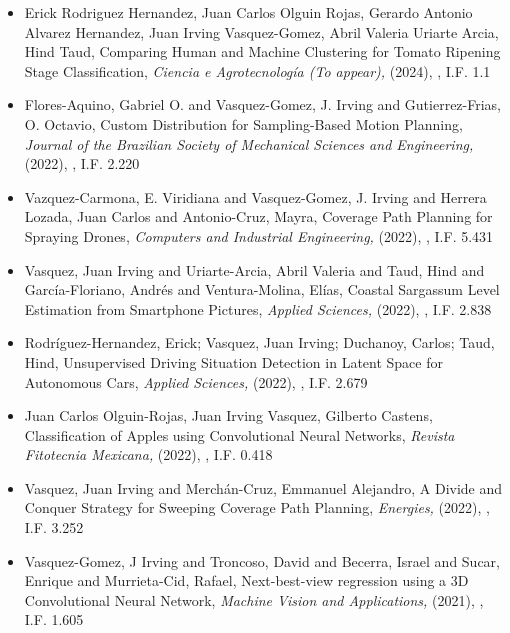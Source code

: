 \begin{itemize} 
\item Erick Rodriguez Hernandez, Juan Carlos Olguin Rojas, Gerardo Antonio Alvarez Hernandez, Juan Irving Vasquez-Gomez, Abril Valeria Uriarte Arcia, Hind Taud, Comparing Human and Machine Clustering for Tomato Ripening Stage Classification,\textit{ Ciencia e Agrotecnología (To appear),} (2024), \href{https://doi.org/} {\faFilePdfO}, I.F. 1.1 
\item Flores-Aquino, Gabriel O. and Vasquez-Gomez, J. Irving and Gutierrez-Frias, O. Octavio, Custom Distribution for Sampling-Based Motion Planning,\textit{ Journal of the Brazilian Society of Mechanical Sciences and Engineering,} (2022), \href{https://doi.org/10.1007/s40430-022-03379-0} {\faFilePdfO}, I.F. 2.220 
\item Vazquez-Carmona, E. Viridiana and Vasquez-Gomez, J. Irving and Herrera Lozada, Juan Carlos and Antonio-Cruz, Mayra, Coverage Path Planning for Spraying Drones,\textit{ Computers and Industrial Engineering,} (2022), \href{https://doi.org/10.1016/j.cie.2022.108125} {\faFilePdfO}, I.F. 5.431 
\item Vasquez, Juan Irving and Uriarte-Arcia, Abril Valeria and Taud, Hind and García-Floriano, Andrés and Ventura-Molina, Elías, Coastal Sargassum Level Estimation from Smartphone Pictures,\textit{ Applied Sciences,} (2022), \href{https://doi.org/10.3390/app121910012} {\faFilePdfO}, I.F. 2.838 
\item Rodríguez-Hernandez, Erick; Vasquez, Juan Irving; Duchanoy, Carlos; Taud, Hind, Unsupervised Driving Situation Detection in Latent Space for
Autonomous Cars,\textit{ Applied Sciences,} (2022), \href{https://doi.org/10.3390/app12073635} {\faFilePdfO}, I.F. 2.679 
\item Juan Carlos Olguin-Rojas, Juan Irving Vasquez, Gilberto Castens, Classification of Apples using Convolutional Neural Networks,\textit{ Revista Fitotecnia Mexicana,} (2022), \href{https://doi.org/10.35196/rfm.2022.3.369} {\faFilePdfO}, I.F. 0.418 
\item Vasquez, Juan Irving and Merchán-Cruz, Emmanuel Alejandro, A Divide and Conquer Strategy for Sweeping Coverage Path Planning,\textit{ Energies,} (2022), \href{https://doi.org/10.3390/en15217898} {\faFilePdfO}, I.F. 3.252 
\item Vasquez-Gomez, J Irving and Troncoso, David and Becerra, Israel and Sucar, Enrique and Murrieta-Cid, Rafael, Next-best-view regression using a 3D Convolutional Neural Network,\textit{ Machine Vision and Applications,} (2021), \href{https://doi.org/10.1007/s00138-020-01166-2} {\faFilePdfO}, I.F. 1.605 

\end{itemize}
